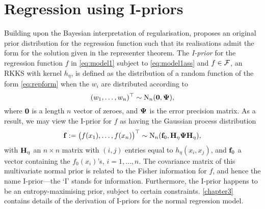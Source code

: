 \documentclass[11pt,twoside,openright,showframe]{report}
\begin{document}
\section{Regression using I-priors}
\label{sec:introregiprior}

Building upon the Bayesian interpretation of regularisation, \citet{bergsma2017} proposes an original prior distribution for the regression function such that its realisations admit the form for the solution given in the representer theorem.
The \emph{I-prior} for the regression function $f$ in \cref{eq:model1} subject to \cref{eq:model1ass} and $f\in{\mathcal F}$, an RKKS with kernel $h_\eta$, is defined as the distribution of a random function of the form \cref{eq:repform} when the $w_i$ are distributed according to 
\[
  (w_1,\dots,w_n)^\top \sim \operatorname{N}_n({\mathbf 0},{\bm\Psi}),
\]
where ${\mathbf 0}$ is a length $n$ vector of zeroes, and ${\bm\Psi}$ is the error precision matrix.
As a result, we may view the I-prior for $f$ as having the Gaussian process distribution
\begin{align}\label{eq:iprior}
  {\mathbf f} := \big(f(x_1),\dots,f(x_n) \big)^\top \sim \operatorname{N}_n({\mathbf f}_0, {\mathbf H}_\eta{\bm\Psi}{\mathbf H}_\eta),
\end{align}
with ${\mathbf H}_{\eta}$ an $n \times n$ matrix with $(i,j)$ entries equal to $h_\eta(x_i,x_j)$, and ${\mathbf f}_0$ a vector containing the $f_0(x_i)$'s, $i=1,\dots,n$.
The covariance matrix of this multivariate normal prior is related to the Fisher information for $f$, and hence the name I-prior---the `I' stands for information.
Furthermore, the I-prior happens to be an entropy-maximising prior, subject to certain constraints.
\cref{chapter3} contains details of the derivation of I-priors for the normal regression model.
\end{document}
